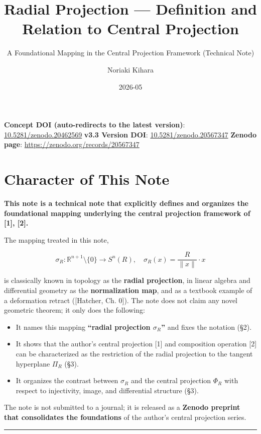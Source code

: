 \documentclass[
]{ltjsarticle}
\title{Radial Projection --- Definition and Relation to Central
Projection}
\subtitle{A Foundational Mapping in the Central Projection Framework
(Technical Note)}
\author{Noriaki Kihara}
\date{2026-05}
\providecommand{\tightlist}{%
  \setlength{\itemsep}{0pt}\setlength{\parskip}{0pt}}
\begin{document}
\maketitle

\textbf{Concept DOI (auto-redirects to the latest version)}:
\href{https://doi.org/10.5281/zenodo.20462569}{10.5281/zenodo.20462569}
\textbf{v3.3 Version DOI}:
\href{https://doi.org/10.5281/zenodo.20567347}{10.5281/zenodo.20567347}
\textbf{Zenodo page}: \url{https://zenodo.org/records/20567347}

\section{Character of This Note}\label{character-of-this-note}

\textbf{This note is a technical note that explicitly defines and
organizes the foundational mapping underlying the central projection
framework of {[}1{]}, {[}2{]}.}

The mapping treated in this note,

\[\sigma_R: \mathbb{R}^{n+1} \setminus \{0\} \to S^n(R), \quad \sigma_R(x) = \frac{R}{\|x\|} \cdot x\]

is classically known in topology as the \textbf{radial projection}, in
linear algebra and differential geometry as the \textbf{normalization
map}, and as a textbook example of a deformation retract ({[}Hatcher,
Ch. 0{]}). The note does not claim any novel geometric theorem; it only
does the following:

\begin{itemize}
\tightlist
\item
  It names this mapping \textbf{``radial projection \(\sigma_R\)''} and
  fixes the notation (§2).
\item
  It shows that the author's central projection {[}1{]} and composition
  operation {[}2{]} can be characterized as the restriction of the
  radial projection to the tangent hyperplane \(\Pi_R\) (§3).
\item
  It organizes the contrast between \(\sigma_R\) and the central
  projection \(\Phi_R\) with respect to injectivity, image, and
  differential structure (§3).
\end{itemize}

The note is not submitted to a journal; it is released as a
\textbf{Zenodo preprint that consolidates the foundations} of the
author's central projection series.

\begin{center}\rule{0.5\linewidth}{0.5pt}\end{center}
\end{document}
